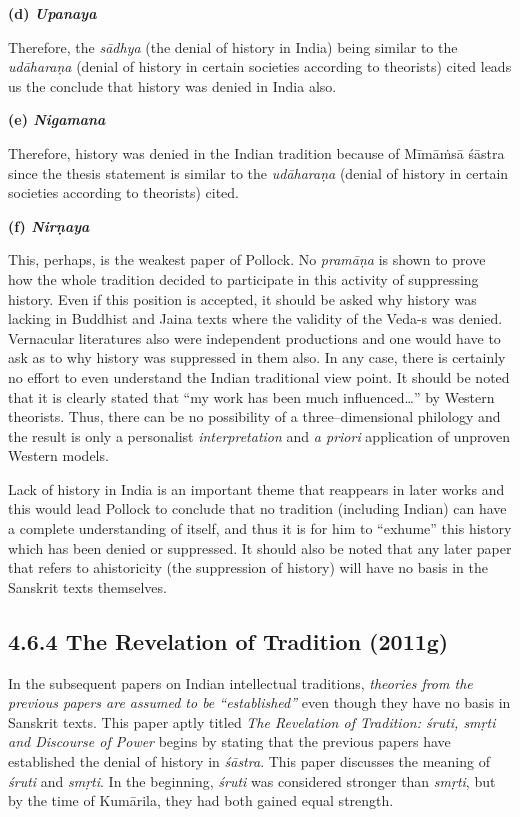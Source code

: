 \textbf{(d) \textit{Upanaya}}

Therefore, the \textit{sādhya} (the denial of history in India) being similar to the \textit{udāharaṇa} (denial of history in certain societies according to theorists) cited leads us the conclude that history was denied in India also.

\textbf{(e) \textit{Nigamana}}

Therefore, history was denied in the Indian tradition because of Mīmāṁsā śāstra since the thesis statement is similar to the \textit{udāharaṇa} (denial of history in certain societies according to theorists) cited.

\textbf{(f) \textit{Nirṇaya}}

This, perhaps, is the weakest paper of Pollock. No \textit{pramāṇa} is shown to prove how the whole tradition decided to participate in this activity of suppressing history. Even if this position is accepted, it should be asked why history was lacking in Buddhist and Jaina texts where the validity of the Veda-s was denied. Vernacular literatures also were independent productions and one would have to ask as to why history was suppressed in them also. In any case, there is certainly no effort to even understand the Indian traditional view point. It should be noted that it is clearly stated that “my work has been much influenced…” by Western theorists. Thus, there can be no possibility of a three–dimensional philology and the result is only a personalist \textit{interpretation} and \textit{a priori} application of unproven Western models.

Lack of history in India is an important theme that reappears in later works and this would lead Pollock to conclude that no tradition (including Indian) can have a complete understanding of itself, and thus it is for him to “exhume” this history which has been denied or suppressed. It should also be noted that any later paper that refers to ahistoricity (the suppression of history) will have no basis in the Sanskrit texts themselves.

\newpage

\subsection*{4.6.4 The Revelation of Tradition (2011g)}

\vspace{-.3cm}

In the subsequent papers on Indian intellectual traditions, \textit{theories from the previous papers are assumed to be “established”} even though they have no basis in Sanskrit texts. This paper aptly titled \textit{The Revelation of Tradition: śruti, smṛti and Discourse of Power} begins by stating that the previous papers have established the denial of history in \textit{śāstra}. This paper discusses the meaning of \textit{śruti} and \textit{smṛti}. In the beginning, \textit{śruti} was considered stronger than \textit{smṛti}, but by the time of Kumārila, they had both gained equal strength.

